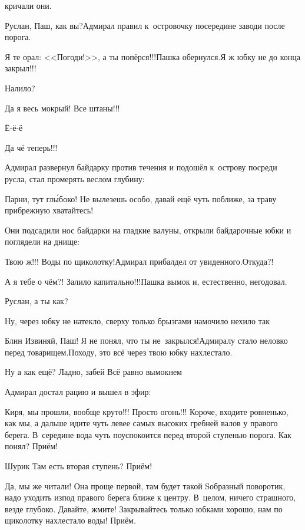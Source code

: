 \mdash кричали они.

\diagdash Руслан, Паш, как вы?\mdash Адмирал правил к~островочку посередине заводи после порога.

\diagdash Я те орал: <<Погоди!>>, а ты попёрся!!!\mdash Пашка обернулся.\mdash Я ж юбку не до конца закрыл!!!

\diagdash Налило?

\diagdash Да я весь мокрый! Все штаны!!!

\diagdash Ё-ё-ё\myldots{}

\diagdash Да чё теперь!!!

Адмирал развернул байдарку против течения и подошёл к~острову посреди русла, стал промерять веслом глубину:

\diagdash Парни, тут гл{\'ы}боко! Не вылезешь особо, давай ещё чуть поближе, за траву прибрежную хватайтесь!

Они подсадили нос байдарки на гладкие валуны, открыли байдарочные юбки и поглядели на днище:

\diagdash Твою ж!!! Воды по щиколотку!\mdash Адмирал прибалдел от увиденного.\mdash Откуда?!

\diagdash А я тебе о чём?! Залило капитально!!!\mdash Пашка вымок и, естественно, негодовал.
 
\diagdash Руслан, а ты как?

\diagdash Ну, через юбку не натекло, сверху только брызгами намочило нехило так\myldots{}

\diagdash Блин\myldots{} Извиняй, Паш! Я не понял, что ты не~закрылся!\mdash Адмиралу стало неловко перед товарищем.\mdash Походу, это всё через твою юбку нахлестало.

\diagdash Ну а как ещё? Ладно, забей\myldots{} Всё равно вымокнем\myldots{}

Адмирал достал рацию и вышел в эфир:

\diagdash Киря, мы прошли, вообще круто!!! Просто огонь!!! Короче, входите ровненько, как мы, а дальше идите чуть левее самых высоких гребней валов у правого берега. В~середине вода чуть поуспокоится перед второй ступенью порога. Как понял? Приём!

\diagdash Шурик\myldots{} Там есть вторая ступень? Приём!

\diagdash Да, мы же читали! Она проще первой, там будет такой S\sdash образный поворотик, надо уходить из\sdash под правого берега ближе к центру. В~целом, ничего страшного, везде глубоко. Давайте, жмите! Закрывайтесь только юбками хорошо, нам по щиколотку нахлестало воды! Приём.

